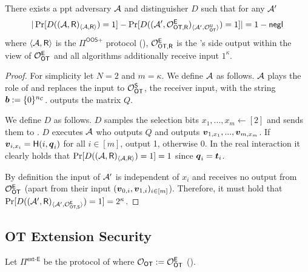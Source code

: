 \begin{lemma} \label{lem:malSend}
	There exists a ppt adversary $\mathcal{A}$ and distinguisher $D$ such that for any $\mathcal{A}'$ 
	$$
		|\Pr[D((\mathcal{A}, \mathsf{R})_{\langle\mathcal{A},\mathsf{R}\rangle})=1]-\Pr[D((\mathcal{A}', \mathcal{O}^{\mathsf{E}}_{\textsf{OT,\ensuremath{\mathsf{R}}}})_{\langle\mathcal{A}',\mathcal{O}^{\mathsf{U}}_{\textsf{OT}}\rangle})=1]|=1-\mathsf{negl}
	$$
	where $\langle\mathcal{A},\mathsf{R}\rangle$ is the $\Pi^{\textsf{OOS+}}$ protocol (), $\mathcal{O}^{\mathsf{E}}_{\textsf{OT,\ensuremath{\mathsf{R}}}}$ is the \rec's side output within the view of $\mathcal{O}_{\mathsf{OT}}^{\mathsf{E}}$ and all algorithms additionally receive input $1^\kappa$. 
\end{lemma}
\begin{proof} 
	For simplicity let $N=2$ and $m=\kappa$. We define $\mathcal{A}$ as follows. $\mathcal{A}$ plays the role of \send and replaces the input to $\mathcal{O}_{\mathsf{OT}}^\mathsf{S}$, the receiver input, with the string $\boldsymbol{b}:=\{0\}^{{n_\mathcal{C}}}$. \Adv outputs the matrix $Q$.
	
	We define $D$ as follows. $D$ samples the selection bits $x_1,...,x_m\gets[2]$ and sends them to \rec. $D$ executes $\mathcal{A}$ who outputs $Q$ and \rec outputs $\boldsymbol{v}_{1,x_1},...,\boldsymbol{v}_{m,x_m}$. If $\boldsymbol{v}_{i,x_i}=\mathsf{H}(i,\boldsymbol{q}_i)$ for all $i\in[m]$, output 1, otherwise 0. In the real interaction it clearly holds that $\Pr[D((\mathcal{A}, \mathsf{R})_{\langle\mathcal{A},\mathsf{R}\rangle})=1]=1$ since $\boldsymbol{q}_i=\boldsymbol{t}_i$.
	
	By definition the input of $\mathcal{A}'$ is independent of $x_i$ and receives no output from $\mathcal{O}_{\mathsf{OT}}^\mathsf{E}$ (apart from their input $(\boldsymbol{v}_{0,i},\boldsymbol{v}_{1,i})_{i\in [m]}$). Therefore, it must hold that $\Pr[D((\mathcal{A}', \mathsf{R})_{\langle\mathcal{A}',\mathcal{O}^{\mathsf{E}}_{\textsf{OT,\ensuremath{\mathsf{S}}}}\rangle})=1]=2^{\kappa}$.
\end{proof}





\subsection{OT Extension Security}


\begin{definition}\label{def:ext_E_E}
	Let $\Pi^{\textsf{ext-E}}$ be the protocol of  where $\mathcal{O}_{\mathsf{OT}}:=\mathcal{O}_{\mathsf{OT}}^\mathsf{E}$ ().
\end{definition}



